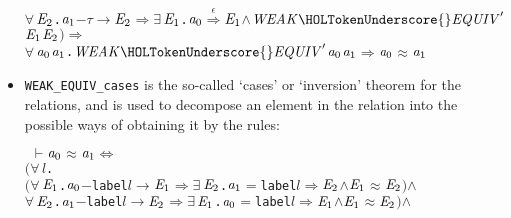 \documentclass[GCNS]{yincog}
\renewcommand{\HOLConst}[1]{\texttt{#1}}
\renewcommand{\HOLBoundVar}[1]{\ensuremath{\mathit{#1}}}
\renewcommand{\HOLFreeVar}[1]{\ensuremath{\mathit{#1}}}
\renewcommand{\HOLSymConst}[1]{#1}
\renewcommand{\HOLTokenConj}{\ensuremath{\wedge}}
\renewcommand{\HOLTokenEquiv}{\ensuremath{\Longleftrightarrow}}
\renewcommand{\HOLTokenExists}{\ensuremath{\exists \,}}
\renewcommand{\HOLTokenForall}{\ensuremath{\forall \,}}
\renewcommand{\HOLTokenTurnstile}{\ensuremath{\:\:\vdash}}
\theoremstyle{remark}
\theoremstyle{theorem}
\theoremstyle{remark}
\newcommand{\HOLTokenWeakEQ}{$\approx$}
\newcommand{\HOLTokenEPS}{$\overset{\epsilon}{\Longrightarrow}$}
\newcommand{\HOLTokenTransBegin}{$-$}
\newcommand{\HOLTokenTransEnd}{$\rightarrow$\xspace}
\newcommand{\HOLTokenWeakTransBegin}{$=$}
\newcommand{\HOLTokenWeakTransEnd}{$\Rightarrow$\xspace}
\renewcommand{\HOLTokenImp}{\ensuremath{\Longrightarrow}}
\begin{document}
\begin{itemize}
\begin{alltt}
        \HOLSymConst{\HOLTokenForall{}}\ensuremath{\HOLBoundVar{E}\sb{\mathrm{2}}}. \ensuremath{\HOLBoundVar{a}\sb{\mathrm{1}}} \HOLTokenTransBegin\HOLSymConst{\ensuremath{\tau}}\HOLTokenTransEnd \ensuremath{\HOLBoundVar{E}\sb{\mathrm{2}}} \HOLSymConst{\HOLTokenImp{}} \HOLSymConst{\HOLTokenExists{}}\ensuremath{\HOLBoundVar{E}\sb{\mathrm{1}}}. \ensuremath{\HOLBoundVar{a}\sb{\mathrm{0}}} \HOLSymConst{\HOLTokenEPS} \ensuremath{\HOLBoundVar{E}\sb{\mathrm{1}}} \HOLSymConst{\HOLTokenConj{}} \ensuremath{\HOLFreeVar{WEAK\HOLTokenUnderscore{}EQUIV}\sp{\prime}} \ensuremath{\HOLBoundVar{E}\sb{\mathrm{1}}} \ensuremath{\HOLBoundVar{E}\sb{\mathrm{2}}}\ensuremath{)} \HOLSymConst{\HOLTokenImp{}}
   \HOLSymConst{\HOLTokenForall{}}\ensuremath{\HOLBoundVar{a}\sb{\mathrm{0}}} \ensuremath{\HOLBoundVar{a}\sb{\mathrm{1}}}. \ensuremath{\HOLFreeVar{WEAK\HOLTokenUnderscore{}EQUIV}\sp{\prime}} \ensuremath{\HOLBoundVar{a}\sb{\mathrm{0}}} \ensuremath{\HOLBoundVar{a}\sb{\mathrm{1}}} \HOLSymConst{\HOLTokenImp{}} \ensuremath{\HOLBoundVar{a}\sb{\mathrm{0}}} \HOLSymConst{\HOLTokenWeakEQ} \ensuremath{\HOLBoundVar{a}\sb{\mathrm{1}}}
\end{alltt}
%
\item \texttt{WEAK\_EQUIV\_cases} is the so-called `cases' or `inversion'
theorem for the relations, and is used to decompose an element in the relation
into the possible ways of obtaining it by the rules:
%
\begin{alltt}
\HOLTokenTurnstile{} \ensuremath{\HOLFreeVar{a}\sb{\mathrm{0}}} \HOLSymConst{\HOLTokenWeakEQ} \ensuremath{\HOLFreeVar{a}\sb{\mathrm{1}}} \HOLSymConst{\HOLTokenEquiv{}}
   \ensuremath{(}\HOLSymConst{\HOLTokenForall{}}\HOLBoundVar{l}.
        \ensuremath{(}\HOLSymConst{\HOLTokenForall{}}\ensuremath{\HOLBoundVar{E}\sb{\mathrm{1}}}. \ensuremath{\HOLFreeVar{a}\sb{\mathrm{0}}} \HOLTokenTransBegin\HOLConst{label} \HOLBoundVar{l}\HOLTokenTransEnd \ensuremath{\HOLBoundVar{E}\sb{\mathrm{1}}} \HOLSymConst{\HOLTokenImp{}} \HOLSymConst{\HOLTokenExists{}}\ensuremath{\HOLBoundVar{E}\sb{\mathrm{2}}}. \ensuremath{\HOLFreeVar{a}\sb{\mathrm{1}}} \HOLTokenWeakTransBegin\HOLConst{label} \HOLBoundVar{l}\HOLTokenWeakTransEnd \ensuremath{\HOLBoundVar{E}\sb{\mathrm{2}}} \HOLSymConst{\HOLTokenConj{}} \ensuremath{\HOLBoundVar{E}\sb{\mathrm{1}}} \HOLSymConst{\HOLTokenWeakEQ} \ensuremath{\HOLBoundVar{E}\sb{\mathrm{2}}}\ensuremath{)} \HOLSymConst{\HOLTokenConj{}}
        \HOLSymConst{\HOLTokenForall{}}\ensuremath{\HOLBoundVar{E}\sb{\mathrm{2}}}. \ensuremath{\HOLFreeVar{a}\sb{\mathrm{1}}} \HOLTokenTransBegin\HOLConst{label} \HOLBoundVar{l}\HOLTokenTransEnd \ensuremath{\HOLBoundVar{E}\sb{\mathrm{2}}} \HOLSymConst{\HOLTokenImp{}} \HOLSymConst{\HOLTokenExists{}}\ensuremath{\HOLBoundVar{E}\sb{\mathrm{1}}}. \ensuremath{\HOLFreeVar{a}\sb{\mathrm{0}}} \HOLTokenWeakTransBegin\HOLConst{label} \HOLBoundVar{l}\HOLTokenWeakTransEnd \ensuremath{\HOLBoundVar{E}\sb{\mathrm{1}}} \HOLSymConst{\HOLTokenConj{}} \ensuremath{\HOLBoundVar{E}\sb{\mathrm{1}}} \HOLSymConst{\HOLTokenWeakEQ} \ensuremath{\HOLBoundVar{E}\sb{\mathrm{2}}}\ensuremath{)} \HOLSymConst{\HOLTokenConj{}}

\end{alltt}
\end{itemize}
\end{document}
